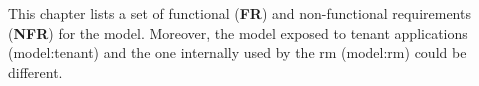 This chapter lists a set of functional (\textbf{FR}) and non-functional requirements (\textbf{NFR}) for the \gls{model}.
Moreover, the model exposed to tenant applications (\gls{model:tenant}) and the one internally used by the \gls{rm} (\gls{model:rm}) could be different.
